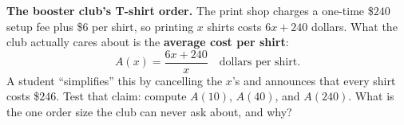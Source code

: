 \documentclass[10pt]{article}
\begin{document}
\vspace{0.10in}

\boxguard[12]
\begin{hookbox}
\small
\textbf{The booster club's T-shirt order.} The print shop charges a one-time \$$240$ setup fee plus
\$$6$ per shirt, so printing $x$ shirts costs $6x+240$ dollars. What the club actually cares about
is the \textbf{average cost per shirt}:
\[ A(x) = \frac{6x+240}{x} \quad \text{dollars per shirt.} \]
A student ``simplifies'' this by cancelling the $x$'s and announces that every shirt costs \$$246$.
Test that claim: compute $A(10)$, $A(40)$, and $A(240)$. What is the one order size the club can
never ask about, and why?

\\
\\
\end{hookbox}

\vspace{0.10in}
\end{document}
